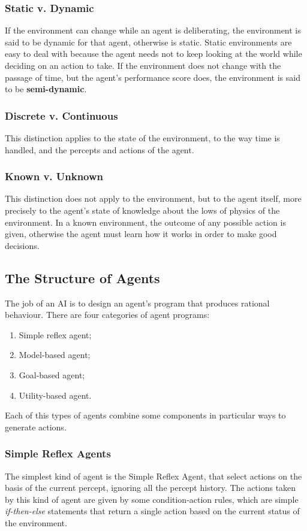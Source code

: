 \documentclass{article}
\begin{document}
\subsubsection{Static v. Dynamic}
If the environment can change while an agent is deliberating, the environment is said to be dynamic for that agent, otherwise is static. Static environments are easy to deal with because the agent needs not to keep looking at the world while deciding on an action to take. If the environment does not change with the passage of time, but the agent's performance score does, the environment is said to be \textbf{semi-dynamic}.

\subsubsection{Discrete v. Continuous}
This distinction applies to the state of the environment, to the way time is handled, and the percepts and actions of the agent.

\subsubsection{Known v. Unknown}
This distinction does not apply to the environment, but to the agent itself, more precisely to the agent's state of knowledge about the lows of physics of the environment. In a known environment, the outcome of any possible action is given, otherwise the agent must learn how it works in order to make good decisions.

\subsection{The Structure of Agents}
The job of an AI is to design an agent's program that produces rational behaviour. There are four categories of agent programs:
\begin{enumerate}
    \item Simple reflex agent;
    \item Model-based agent;
    \item Goal-based agent;
    \item Utility-based agent.
\end{enumerate}

Each of this types of agents combine some components in particular ways to generate actions.

\subsubsection{Simple Reflex Agents}
The simplest kind of agent is the Simple Reflex Agent, that select actions on the basis of the current percept, ignoring all the percept history. The actions taken by this kind of agent are given by some condition-action rules, which are simple \textit{if-then-else} statements that return a single action based on the current status of the environment.
\end{document}
